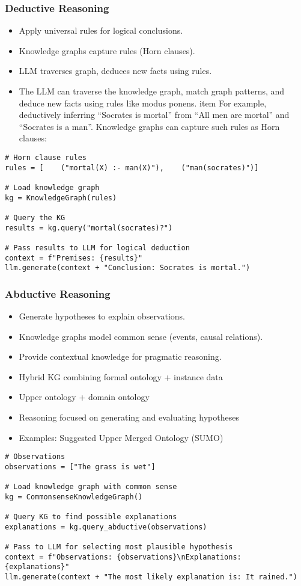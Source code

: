 \begin{frame}[fragile]
\frametitle{Deductive Reasoning}
\begin{itemize}
    \item Apply universal rules for logical conclusions.
    \item Knowledge graphs capture rules (Horn clauses).
    \item LLM traverses graph, deduces new facts using rules.
	\item The LLM can traverse the knowledge graph, match graph patterns, and deduce new facts using rules like modus ponens.
	item For example, deductively inferring “Socrates is mortal” from “All men are mortal” and “Socrates is a man”. Knowledge graphs can capture such rules as Horn clauses:
\end{itemize}

\begin{lstlisting}
# Horn clause rules
rules = [    ("mortal(X) :- man(X)"),    ("man(socrates)")]

# Load knowledge graph
kg = KnowledgeGraph(rules) 

# Query the KG
results = kg.query("mortal(socrates)?")

# Pass results to LLM for logical deduction
context = f"Premises: {results}"
llm.generate(context + "Conclusion: Socrates is mortal.")
\end{lstlisting}
\end{frame}

\begin{frame}[fragile]
\frametitle{Abductive Reasoning}
\begin{itemize}
    \item Generate hypotheses to explain observations.
    \item Knowledge graphs model common sense (events, causal relations).
    \item Provide contextual knowledge for pragmatic reasoning.
    \item Hybrid KG combining formal ontology + instance data
    \item Upper ontology + domain ontology
    \item Reasoning focused on generating and evaluating hypotheses
    \item Examples: Suggested Upper Merged Ontology (SUMO)
\end{itemize}

\begin{lstlisting}
# Observations
observations = ["The grass is wet"] 

# Load knowledge graph with common sense
kg = CommonsenseKnowledgeGraph()

# Query KG to find possible explanations 
explanations = kg.query_abductive(observations)

# Pass to LLM for selecting most plausible hypothesis
context = f"Observations: {observations}\nExplanations: {explanations}"
llm.generate(context + "The most likely explanation is: It rained.")
\end{lstlisting}
\end{frame}

